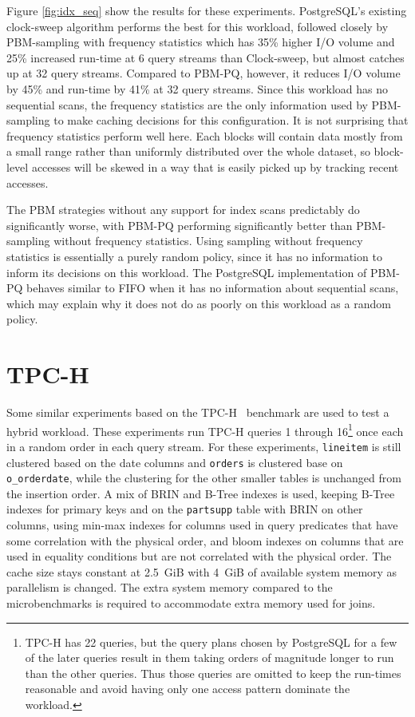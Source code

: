 Figure \ref{fig:idx_seq} show the results for these experiments. PostgreSQL's existing clock-sweep algorithm performs the best for this workload, followed closely by PBM-sampling with frequency statistics which has 35\% higher I/O volume and 25\% increased run-time at 6 query streams than Clock-sweep, but almost catches up at 32 query streams. Compared to PBM-PQ, however, it reduces I/O volume by 45\% and run-time by 41\% at 32 query streams. Since this workload has no sequential scans, the frequency statistics are the only information used by PBM-sampling to make caching decisions for this configuration. It is not surprising that frequency statistics perform well here. Each blocks will contain data mostly from a small range rather than uniformly distributed over the whole dataset, so block-level accesses will be skewed in a way that is easily picked up by tracking recent accesses.

The PBM strategies without any support for index scans predictably do significantly worse, with PBM-PQ performing significantly better than PBM-sampling without frequency statistics. Using sampling without frequency statistics is essentially a purely random policy, since it has no information to inform its decisions on this workload. The PostgreSQL implementation of PBM-PQ behaves similar to FIFO when it has no information about sequential scans, which may explain why it does not do as poorly on this workload as a random policy.


\section{TPC-H}

Some similar experiments based on the TPC-H~\cite{tpch} benchmark are used to test a hybrid workload. These experiments run TPC-H queries 1 through 16\footnote{TPC-H has 22 queries, but the query plans chosen by PostgreSQL for a few of the later queries result in them taking orders of magnitude longer to run than the other queries. Thus those queries are omitted to keep the run-times reasonable and avoid having only one access pattern dominate the workload.} once each in a random order in each query stream. For these experiments, \verb|lineitem| is still clustered based on the date columns and \verb|orders| is clustered base on \verb|o_orderdate|, while the clustering for the other smaller tables is unchanged from the insertion order. A mix of BRIN and B-Tree indexes is used, keeping B-Tree indexes for primary keys and on the \verb|partsupp| table with BRIN on other columns, using min-max indexes for columns used in query predicates that have some correlation with the physical order, and bloom indexes on columns that are used in equality conditions but are not correlated with the physical order. The cache size stays constant at 2.5~GiB with 4~GiB of available system memory as parallelism is changed. The extra system memory compared to the microbenchmarks is required to accommodate extra memory used for joins.

